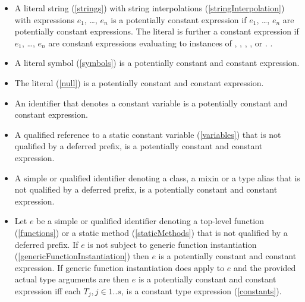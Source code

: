 \documentclass[makeidx]{article}
\begin{document}
{\begin{itemize}
\item A literal string (\ref{strings}) with string interpolations
  (\ref{stringInterpolation})
  with expressions $e_1$, \ldots{}, $e_n$ is a potentially constant expression
  if $e_1$, \ldots{}, $e_n$ are potentially constant expressions.
  The literal is further a constant expression
  if $e_1$, \ldots{}, $e_n$ are constant expressions
  evaluating to instances of , ,
  , , or .
.

\item A literal symbol (\ref{symbols}) is a potentially constant and constant expression.

\item The literal \NULL{} (\ref{null}) is a potentially constant and constant expression.

\item An identifier that denotes a constant variable is a potentially constant and constant expression.

\item A qualified reference to a static constant variable (\ref{variables}) that is not qualified by a deferred prefix, is a potentially constant and constant expression.

\item A simple or qualified identifier denoting a class, a mixin or a type alias that is not qualified by a deferred prefix, is a potentially constant and constant expression.

\item Let $e$ be a simple or qualified identifier denoting
a top-level function (\ref{functions}) or a static method (\ref{staticMethods})
that is not qualified by a deferred prefix.
If $e$ is not subject to generic function instantiation
(\ref{genericFunctionInstantiation})
then $e$ is a potentially constant and constant expression.
If generic function instantiation does apply to $e$
and the provided actual type arguments are 
then $e$ is a potentially constant and constant expression
if{}f each $T_j, j \in 1 .. s$, is a constant type expression
(\ref{constants}).


\end{itemize}}
\end{document}
